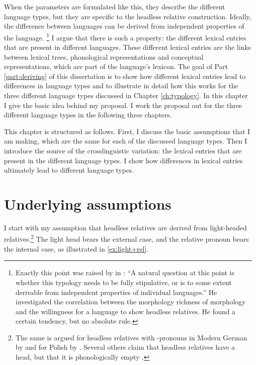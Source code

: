 When the parameters are formulated like this, they describe the different language types, but they are specific to the headless relative construction. Ideally, the difference between languages can be derived from independent properties of the language.
\footnote{
Exactly this point was raised by in \citet[][147]{grosu1994}:
``A natural question at this point is whether this typology needs to be fully stipulative, or is to some extent derivable from independent properties of individual languages.''
He investigated the correlation between the morphology richness of morphology and the willingness for a language to show headless relatives. He found a certain tendency, but no absolute rule.
}
I argue that there is such a property: the different lexical entries that are present in different languages. These different lexical entries are the links between lexical trees, phonological representations and conceptual representations, which are part of the language's lexicon.
The goal of Part \ref{part:deriving} of this dissertation is to show how different lexical entries lead to differences in language types and to illustrate in detail how this works for the three different language types discussed in Chapter \ref{ch:typology}. In this chapter I give the basic idea behind my proposal. I work the proposal out for the three different language types in the following three chapters.

This chapter is structured as follows.
First, I discuss the basic assumptions that I am making, which are the same for each of the discussed language types. Then I introduce the source of the crosslinguistic variation: the lexical entries that are present in the different language types. I show how differences in lexical entries ultimately lead to different language types.


\section{Underlying assumptions}\label{sec:assumptions}

I start with my assumption that headless relatives are derived from light-headed relatives.\footnote{
The same is argued for headless relatives with -pronouns in Modern German by \citet{fuss2014,hanink2018} and for Polish by \citet{citko2004}.
Several others claim that headless relatives have a head, but that it is phonologically empty \citep[cf.][]{bresnan1978,groos1981,himmelreich2017}.
}
The light head bears the external case, and the relative pronoun bears the internal case, as illustrated in \ref{ex:light+rel}.


